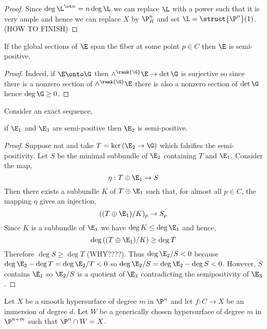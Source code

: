 \documentclass[12pt]{article}
\begin{document}
\begin{proof}
Since $\deg{\L^{\ot n}} = n \deg{\L}$ we can replace $\L$ with a power such that it is very ample and hence we can replace $X$ by $\P^n_R$ and set $\L = \struct{\P^n}(1)$. (HOW TO FINISH)
\end{proof}

\begin{lemma}
If the global sections of $\E$ span the fiber at some point $p \in C$ then $\E$ is semi-positive.
\end{lemma}

\begin{proof}
Indeed, if $\E \onto \G$ then $\wedge^{\rank{\G}} \E \to \det{\G}$ is surjective so since there is a nonzero section of $\wedge^{\rank{\G}}{\E}$ there is also a nonzero section of $\det{\G}$ hence $\deg{\G} \ge 0$.
\end{proof}

\begin{lemma}
Consider an exact sequence,
\begin{center}
\end{center}
if $\E_1$ and $\E_3$ are semi-positive then $\E_2$ is semi-positive.
\end{lemma}

\begin{proof}
Suppose not and take $T = \ker{(\E_2 \to \G)}$ which falsifies the semi-positivity. Let $S$ be the minimal subbundle of $\E_2$ containing $T$ and $\E_1$. Consider the map,
\[ \eta : T \oplus \E_1 \to S \]
Then there exists a subbundle $K$ of $T \oplus \E_1$ such that, for almost all $p \in C$, the mapping $\eta$ gives an injection,
\[ ((T \oplus \E_1)/K)_p \to S_p \]
Since $K$ is a subbundle of $\E_1$ we have $\deg{K} \le \deg{\E_1}$ and hence, 
\[ \deg{((T \oplus \E_1)/K)} \ge \deg{T} \]
Therefore $\deg{S} \ge \deg{T}$ (WHY????). Thus $\deg{\E_2/S} < 0$ because $\deg{\E_2} - \deg{T} = \deg{\E_2/T} < 0$ so $\deg{\E_2 / S} = \deg{\E_2} - \deg{S} < 0$. However, $S$ contains $\E_1$ so $\E_2 / S$ is a quotient of $\E_3$ contradicting the semipositivity of $\E_3$. 
\end{proof}


Let $X$ be a smooth hypersurface of degree $m$ in $\P^n$ and let $f : C \to X$ be an immersion of degree $d$. Let $W$ be a generically chosen hypersurface of degree $m$ in $\P^{n+m}$ such that $\P^n \cap W = X$. 
\end{document}
